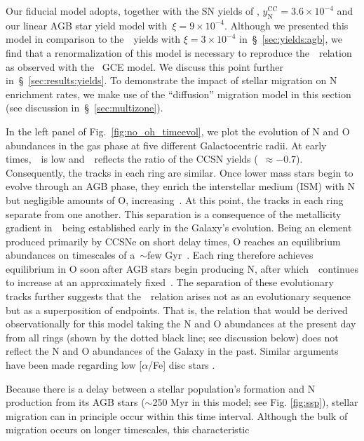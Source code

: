 \documentclass[ms.tex]{subfiles}
\begin{document}
Our fiducial model adopts, together with the SN yields of
\citet[][see discussion in~\S~\ref{sec:yields:ccsne}]{Johnson2021},
$y_\text{N}^\text{CC} = 3.6\times10^{-4}$ and our linear AGB star yield model
with~$\xi = 9\times10^{-4}$.
Although we presented this model in comparison to the~\cristallo~yields with
$\xi = 3\times10^{-4}$ in~\S~\ref{sec:yields:agb}, we find that a
renormalization of this model is necessary to reproduce the~\ohno~relation as observed with the~\citet{Johnson2021} GCE model.
We discuss this point further in~\S~\ref{sec:results:yields}.
To demonstrate the impact of stellar migration on N enrichment rates, we make
use of the ``diffusion'' migration model in this section (see discussion
in~\S~\ref{sec:multizone}).
\par
In the left panel of Fig.~\ref{fig:no_oh_timeevol}, we plot the evolution of N
and O abundances in the gas phase at five different Galactocentric radii.
At early times,~\oh~is low and~\no~reflects the ratio of the CCSN yields
(\no\subcc~$\approx -0.7$).
Consequently, the tracks in each ring are similar.
Once lower mass stars begin to evolve through an AGB phase, they enrich the
interstellar medium (ISM) with N but negligible amounts of O, increasing~\no.
At this point, the tracks in each ring separate from one another.
This separation is a consequence of the metallicity gradient in~\oh~being
established early in the Galaxy's evolution.
Being an element produced primarily by CCSNe on short delay times, O reaches
an equilibrium abundances on timescales of a~$\sim$few Gyr~\citep{Weinberg2017}.
Each ring therefore achieves equilibrium in O soon after AGB stars begin
producing N, after which~\no~continues to increase at an approximately
fixed~\oh.
The separation of these evolutionary tracks further suggests that
the~\ohno~relation arises not as an evolutionary sequence but as a
superposition of endpoints.
That is, the relation that would be derived observationally for this model
taking the N and O abundances at the present day from all rings (shown by the
dotted black line; see discussion below) does not reflect the N and O
abundances of the Galaxy in the past.
Similar arguments have been made regarding low [$\alpha$/Fe] disc stars
\citep[e.g.][]{Schoenrich2009, Sharma2020}.
\par
Because there is a delay between a stellar population's formation and N
production from its AGB stars ($\sim$250 Myr in this model; see Fig.
\ref{fig:ssp}), stellar migration can in principle occur within this time
interval.
Although the bulk of migration occurs on longer timescales, this characteristic
\end{document}
